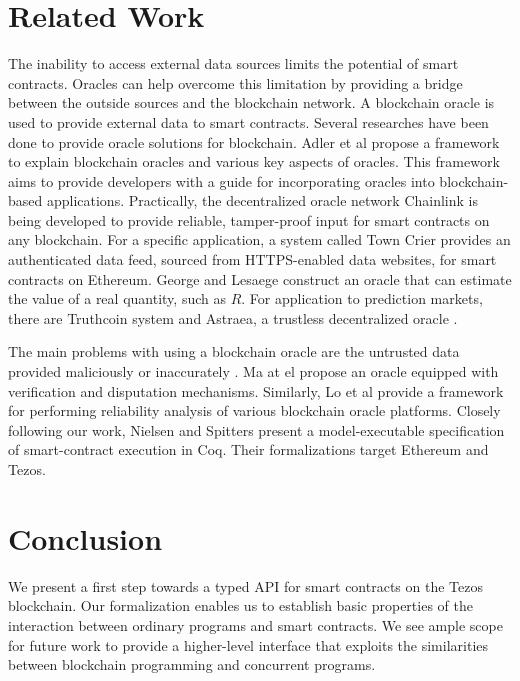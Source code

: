 \documentclass[runningheads]{llncs}
\begin{document}
\section{Related Work}
\label{sec:related work}
The inability to access external data sources limits the potential of
smart contracts. Oracles
\cite{oracle-patterns,call-action-oracle,oracles-study} can help
overcome this limitation by providing a bridge between the outside
sources and the blockchain network. A blockchain oracle is used to
provide external data to smart contracts. Several researches have been
done to provide oracle solutions for blockchain. Adler et al
\cite{blockchain-oracles} propose a framework to explain blockchain
oracles and various key aspects of oracles. This framework aims to
provide developers with a guide for incorporating oracles into
blockchain-based applications. Practically, the decentralized oracle
network Chainlink \cite{chainlink-whitepaper} is being developed to
provide reliable, tamper-proof input for smart contracts on any
blockchain. For a specific application, a system called Town Crier
\cite{town-crier} provides an authenticated data feed, sourced from
HTTPS-enabled data websites, for smart contracts on Ethereum. George
and Lesaege \cite{oracle-real-value} construct an oracle that can
estimate the value of a real quantity, such as $R$.  
For application to prediction markets, there are Truthcoin system
\cite{truthcoin-whitepaper} and Astraea, a trustless decentralized
oracle \cite{astraea}.   

The main problems with using a blockchain oracle are the untrusted
data provided maliciously or inaccurately \cite{trustworthy}. Ma at el
\cite{reliable-oracle} propose an oracle equipped with 
verification and disputation mechanisms. Similarly, Lo et al
\cite{reliablity-oracles} provide a framework for performing
reliability analysis of various blockchain oracle platforms. Closely
following our work, Nielsen and Spitters \cite{interact-coq} present a
model-executable specification of smart-contract execution in
Coq. Their formalizations target Ethereum and Tezos.  

\section{Conclusion}
\label{sec:conclusion}

We present a first step towards a typed API for smart contracts on the
Tezos blockchain. Our formalization enables us to establish basic
properties of the interaction between ordinary programs and smart
contracts. We see ample scope for future work to provide a
higher-level interface that exploits the similarities between
blockchain programming and concurrent programs.




\end{document}
